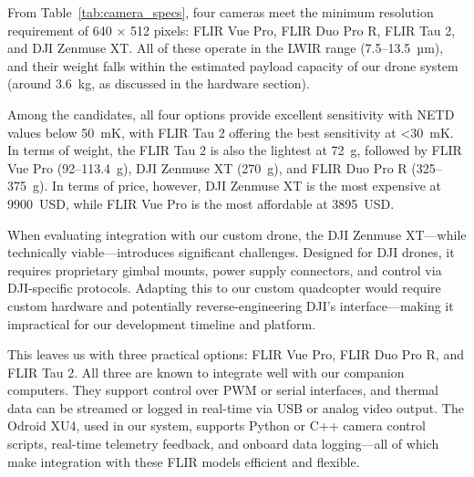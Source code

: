 From Table~\ref{tab:camera_specs}, four cameras meet the minimum resolution requirement of 640 × 512 pixels: FLIR Vue Pro, FLIR Duo Pro R, FLIR Tau 2, and DJI Zenmuse XT. All of these operate in the LWIR range (7.5–13.5~µm), and their weight falls within the estimated payload capacity of our drone system (around 3.6~kg, as discussed in the hardware section).

Among the candidates, all four options provide excellent sensitivity with NETD values below 50~mK, with FLIR Tau 2 offering the best sensitivity at <30~mK. In terms of weight, the FLIR Tau 2 is also the lightest at 72~g, followed by FLIR Vue Pro (92–113.4~g), DJI Zenmuse XT (270~g), and FLIR Duo Pro R (325–375~g). In terms of price, however, DJI Zenmuse XT is the most expensive at 9900~USD, while FLIR Vue Pro is the most affordable at 3895~USD.

When evaluating integration with our custom drone, the DJI Zenmuse XT—while technically viable—introduces significant challenges. Designed for DJI drones, it requires proprietary gimbal mounts, power supply connectors, and control via DJI-specific protocols. Adapting this to our custom quadcopter would require custom hardware and potentially reverse-engineering DJI’s interface—making it impractical for our development timeline and platform.

This leaves us with three practical options: FLIR Vue Pro, FLIR Duo Pro R, and FLIR Tau 2. All three are known to integrate well with our companion computers. They support control over PWM or serial interfaces, and thermal data can be streamed or logged in real-time via USB or analog video output. The Odroid XU4, used in our system, supports Python or C++ camera control scripts, real-time telemetry feedback, and onboard data logging—all of which make integration with these FLIR models efficient and flexible.


